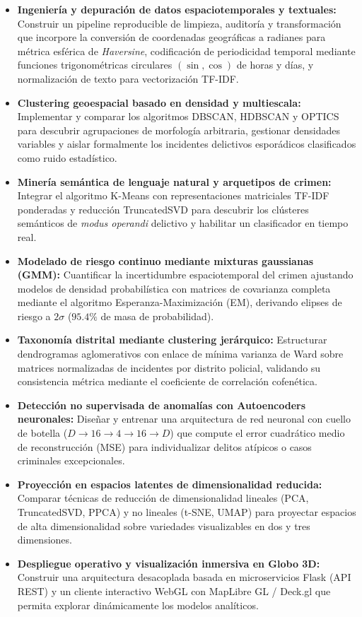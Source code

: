 \begin{itemize}
    \item \textbf{Ingeniería y depuración de datos espaciotemporales y textuales:} Construir un pipeline reproducible de limpieza, auditoría y transformación que incorpore la conversión de coordenadas geográficas a radianes para métrica esférica de \textit{Haversine}, codificación de periodicidad temporal mediante funciones trigonométricas circulares $(\sin, \cos)$ de horas y días, y normalización de texto para vectorización TF-IDF.
    \item \textbf{Clustering geoespacial basado en densidad y multiescala:} Implementar y comparar los algoritmos DBSCAN, HDBSCAN y OPTICS para descubrir agrupaciones de morfología arbitraria, gestionar densidades variables y aislar formalmente los incidentes delictivos esporádicos clasificados como ruido estadístico.
    \item \textbf{Minería semántica de lenguaje natural y arquetipos de crimen:} Integrar el algoritmo K-Means con representaciones matriciales TF-IDF ponderadas y reducción TruncatedSVD para descubrir los clústeres semánticos de \textit{modus operandi} delictivo y habilitar un clasificador en tiempo real.
    \item \textbf{Modelado de riesgo continuo mediante mixturas gaussianas (GMM):} Cuantificar la incertidumbre espaciotemporal del crimen ajustando modelos de densidad probabilística con matrices de covarianza completa mediante el algoritmo Esperanza-Maximización (EM), derivando elipses de riesgo a $2\sigma$ ($95.4\%$ de masa de probabilidad).
    \item \textbf{Taxonomía distrital mediante clustering jerárquico:} Estructurar dendrogramas aglomerativos con enlace de mínima varianza de Ward sobre matrices normalizadas de incidentes por distrito policial, validando su consistencia métrica mediante el coeficiente de correlación cofenética.
    \item \textbf{Detección no supervisada de anomalías con Autoencoders neuronales:} Diseñar y entrenar una arquitectura de red neuronal con cuello de botella ($D \to 16 \to 4 \to 16 \to D$) que compute el error cuadrático medio de reconstrucción (MSE) para individualizar delitos atípicos o casos criminales excepcionales.
    \item \textbf{Proyección en espacios latentes de dimensionalidad reducida:} Comparar técnicas de reducción de dimensionalidad lineales (PCA, TruncatedSVD, PPCA) y no lineales (t-SNE, UMAP) para proyectar espacios de alta dimensionalidad sobre variedades visualizables en dos y tres dimensiones.
    \item \textbf{Despliegue operativo y visualización inmersiva en Globo 3D:} Construir una arquitectura desacoplada basada en microservicios Flask (API REST) y un cliente interactivo WebGL con MapLibre GL / Deck.gl que permita explorar dinámicamente los modelos analíticos.
\end{itemize}

